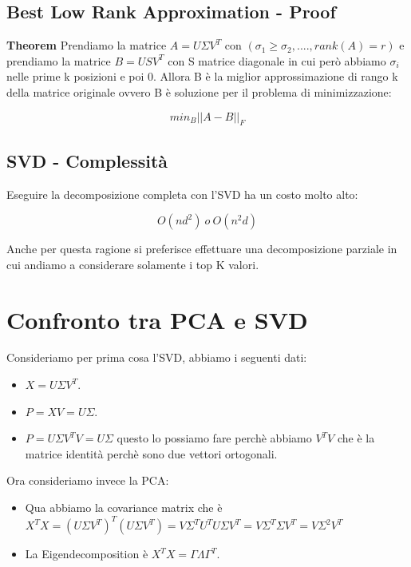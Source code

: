 \documentclass[14pt]{extreport}
\begin{document}
\subsection{Best Low Rank Approximation - Proof}

\textbf{Theorem}
Prendiamo la matrice $A = U \Sigma V^T$ con $(\sigma_1 \geq \sigma_2, ...., rank(A)=r)$ e prendiamo la matrice $B = USV^{T}$ con S matrice diagonale
in cui però abbiamo $\sigma_i$ nelle prime k posizioni e poi 0. Allora B è la miglior approssimazione di rango k della matrice originale ovvero B è
soluzione per il problema di minimizzazione:

$$min_B ||A-B||_F$$

\subsection{SVD - Complessità}

Eseguire la decomposizione completa con l'SVD ha un costo molto alto:

$$O(nd^2) \ o \ O(n^{2}d)$$

Anche per questa ragione si preferisce effettuare una decomposizione parziale in cui andiamo a considerare solamente i top K valori.

\section{Confronto tra PCA e SVD}

Consideriamo per prima cosa l'SVD, abbiamo i seguenti dati:

\begin{itemize}
	\item $X = U \Sigma V^T$.
	\item $P = XV = U \Sigma$.
	\item $P = U \Sigma V^T V = U \Sigma$ questo lo possiamo fare perchè abbiamo $V^T V$ che è la matrice identità perchè sono due vettori ortogonali.
\end{itemize}

Ora consideriamo invece la PCA:

\begin{itemize}
	\item Qua abbiamo la covariance matrix che è $X^TX = (U \Sigma V^T)^T(U \Sigma V^T) = V \Sigma^T U^T U \Sigma V^T = V \Sigma^T \Sigma V^T = V
	\Sigma^2 V^T$
	\item La Eigendecomposition è $X^T X = \Gamma \Lambda \Gamma^T$.
\end{itemize}
\end{document}
